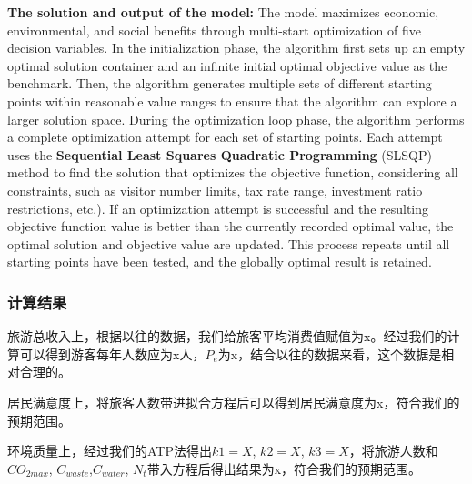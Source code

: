 \documentclass[12pt]{article}  %
\begin{document}
\textbf{The solution and output of the model:} The model maximizes economic, environmental, and social benefits through multi-start optimization of five decision variables. In the initialization phase, the algorithm first sets up an empty optimal solution container and an infinite initial optimal objective value as the benchmark. Then, the algorithm generates multiple sets of different starting points within reasonable value ranges to ensure that the algorithm can explore a larger solution space. During the optimization loop phase, the algorithm performs a complete optimization attempt for each set of starting points. Each attempt uses the \textbf{Sequential Least Squares Quadratic Programming} (SLSQP) method to find the solution that optimizes the objective function, considering all constraints, such as visitor number limits, tax rate range, investment ratio restrictions, etc.). If an optimization attempt is successful and the resulting objective function value is better than the currently recorded optimal value, the optimal solution and objective value are updated. This process repeats until all starting points have been tested, and the globally optimal result is retained.

\subsubsection{计算结果}
旅游总收入上，根据以往的数据，我们给旅客平均消费值赋值为x。经过我们的计算可以得到游客每年人数应为x人，$P_e$为x，结合以往的数据来看，这个数据是相对合理的。

居民满意度上，将旅客人数带进拟合方程后可以得到居民满意度为x，符合我们的预期范围。

环境质量上，经过我们的ATP法得出$k1 = X$, $k2 = X$, $k3 = X$，将旅游人数和$CO_{2max}$, $C_{waste}$,$C_{water}$, $N_t$带入方程后得出结果为x，符合我们的预期范围。
\end{document}
